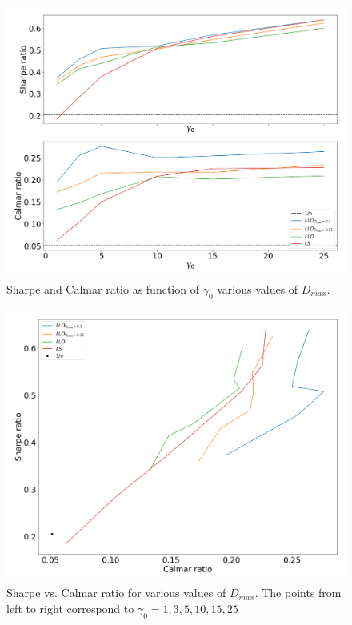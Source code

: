 \begin{figure}[H]
    \centering
    \includegraphics[width=1\textwidth]{analysis/portfolio_exercise/images/mle/sharpe_frontier_llo.png}
    \caption[Sharpe and Calmar ratio as function of $\gamma_0$ various values of $D_{max}$]{Sharpe and Calmar ratio as function of $\gamma_0$ various values of $D_{max}$.}
    \label{fig:MPC_sharpe_frontier_llo}
\end{figure}

\begin{figure}[H]
    \centering
    \includegraphics[width=1\textwidth]{analysis/portfolio_exercise/images/mle/sharpe_calmar_llo.png}
    \caption[Sharpe vs. Calmar ratio for various values of $D_{max}$]{Sharpe vs. Calmar ratio for various values of $D_{max}$. The points from left to right correspond to $\gamma_0=1,3,5,10,15,25$}
    \label{fig:MPC_sharpe_calmar_llo}
\end{figure}

